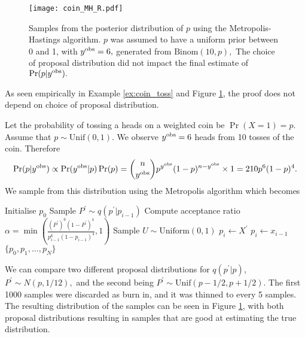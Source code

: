\begin{figure}[htbp]
    \centering
    \texttt{[image: coin\_MH\_R.pdf]}
    \caption{
        Samples from the posterior distribution of $p$ using the
        Metropolis-Hastings algorithm. $p$ was assumed to
        have a uniform prior between 0 and 1, with $y^{\mathrm{obs}} = 6,$ generated
        from $\mathrm{Binom}(10, p),$
        The choice of proposal distribution did not impact the final estimate
        of $\Pr(p | y^{\mathrm{obs}}).$
    }
    \label{fig:coin_R}
\end{figure}

As seen empirically in Example \ref{ex:coin_toss} and Figure \ref{fig:coin_R}, 
the proof does not depend on choice of proposal distribution.

\begin{example}\label{ex:coin_toss}
    Let the probability of tossing a heads on a weighted coin be
    $\Pr(X = 1) = p.$ Assume that $p\sim \mathrm{Unif}(0,1).$
    We observe $y^{\mathrm{obs}} = 6$ heads from 10 tosses of the coin.
    Therefore
    $$
        \Pr(p | y^{\mathrm{obs}}) \propto \Pr(y^{\mathrm{obs}}| p)\Pr(p)
        = \binom{n}{y^{\mathrm{obs}}}p^{y^{\mathrm{obs}}}(1 - p)^{n - y^{\mathrm{obs}}}\times 1
        = 210p^6(1-p)^4.
    $$
    We sample from this distribution using the Metropolis algorithm which
    becomes
    \begin{algorithmic}
        \State Initialise $p_0$
        \State Sample $P^\prime \sim q(p^\prime|p_{i - 1})$
        \State Compute acceptance ratio
        $\alpha
            = \min\left(
            \frac{(P^\prime)^6(1-P^\prime)^4}{p_{i - 1}^6(1-p_{i - 1})^4}, 1
            \right)$ 
        \State Sample $U \sim \text{Uniform}(0, 1)$
        \State $p_i \gets X^\prime$
        \Else
        \State $p_i \gets x_{i - 1}$
        \EndIf
        \EndFor
        \State \Return $\{p_0, p_1, \dots, p_N\}$
    \end{algorithmic}

    We can compare two
    different proposal distributions for $q(p^\prime | p)$,
    $P^\prime \sim N(p, 1/12),$ and
    the second being $P^\prime \sim \mathrm{Unif}(p - 1/2, p + 1/2).$ The first
    1000 samples were discarded as burn in, and it was thinned to every 5
    samples.
    The resulting distribution of the samples can be seen in Figure
    \ref{fig:coin_R}, with both proposal distributions resulting in samples
    that are good at estimating the true distribution.
\end{example}

